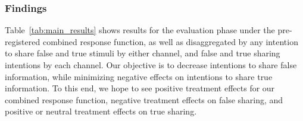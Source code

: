 \documentclass[letterpaper, 12pt, parskip=full,DIV=10]{scrartcl}
\begin{document}
\subsubsection{Findings}

Table~\ref{tab:main_results} shows results for the evaluation phase under the pre-registered combined response function, as well as disaggregated by any intention to share false and true stimuli by either channel, and false and true sharing intentions by each channel. Our objective is to decrease intentions to share false information, while minimizing negative effects on intentions to share true information. To this end, we hope to see positive treatment effects for our combined response function, negative treatment effects on false sharing, and positive or neutral treatment effects on true sharing. 
\end{document}
